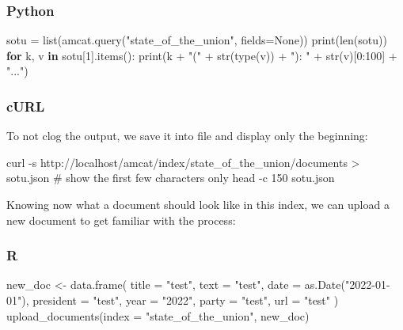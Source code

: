 \documentclass[
  letterpaper,
  DIV=11,
  numbers=noendperiod]{scrreprt}
\newenvironment{Shaded}{\begin{snugshade}}{\end{snugshade}}
\newcommand{\AttributeTok}[1]{\textcolor[rgb]{0.40,0.45,0.13}{#1}}
\newcommand{\BuiltInTok}[1]{\textcolor[rgb]{0.00,0.23,0.31}{#1}}
\newcommand{\CommentTok}[1]{\textcolor[rgb]{0.37,0.37,0.37}{#1}}
\newcommand{\ControlFlowTok}[1]{\textcolor[rgb]{0.00,0.23,0.31}{\textbf{#1}}}
\newcommand{\DecValTok}[1]{\textcolor[rgb]{0.68,0.00,0.00}{#1}}
\newcommand{\ExtensionTok}[1]{\textcolor[rgb]{0.00,0.23,0.31}{#1}}
\newcommand{\FunctionTok}[1]{\textcolor[rgb]{0.28,0.35,0.67}{#1}}
\newcommand{\KeywordTok}[1]{\textcolor[rgb]{0.00,0.23,0.31}{\textbf{#1}}}
\newcommand{\NormalTok}[1]{\textcolor[rgb]{0.00,0.23,0.31}{#1}}
\newcommand{\OperatorTok}[1]{\textcolor[rgb]{0.37,0.37,0.37}{#1}}
\newcommand{\OtherTok}[1]{\textcolor[rgb]{0.00,0.23,0.31}{#1}}
\newcommand{\StringTok}[1]{\textcolor[rgb]{0.13,0.47,0.30}{#1}}
\newcommand{\VariableTok}[1]{\textcolor[rgb]{0.07,0.07,0.07}{#1}}
\begin{document}
\subsubsection{Python}

\begin{Shaded}
\begin{Highlighting}[]
\NormalTok{sotu }\OperatorTok{=} \BuiltInTok{list}\NormalTok{(amcat.query(}\StringTok{"state\_of\_the\_union"}\NormalTok{, fields}\OperatorTok{=}\VariableTok{None}\NormalTok{))}
\BuiltInTok{print}\NormalTok{(}\BuiltInTok{len}\NormalTok{(sotu))}
\ControlFlowTok{for}\NormalTok{ k, v }\KeywordTok{in}\NormalTok{ sotu[}\DecValTok{1}\NormalTok{].items():}
  \BuiltInTok{print}\NormalTok{(k }\OperatorTok{+} \StringTok{"("} \OperatorTok{+} \BuiltInTok{str}\NormalTok{(}\BuiltInTok{type}\NormalTok{(v)) }\OperatorTok{+} \StringTok{"): "} \OperatorTok{+} \BuiltInTok{str}\NormalTok{(v)[}\DecValTok{0}\NormalTok{:}\DecValTok{100}\NormalTok{] }\OperatorTok{+} \StringTok{"..."}\NormalTok{)}
\end{Highlighting}
\end{Shaded}

\subsubsection{cURL}

To not clog the output, we save it into file and display only the
beginning:

\begin{Shaded}
\begin{Highlighting}[]
\ExtensionTok{curl} \AttributeTok{{-}s}\NormalTok{ http://localhost/amcat/index/state\_of\_the\_union/documents }\OperatorTok{\textgreater{}}\NormalTok{ sotu.json}
\CommentTok{\# show the first few characters only}
\FunctionTok{head} \AttributeTok{{-}c}\NormalTok{ 150 sotu.json}
\end{Highlighting}
\end{Shaded}

Knowing now what a document should look like in this index, we can
upload a new document to get familiar with the process:

\subsubsection{R}

\begin{Shaded}
\begin{Highlighting}[]
\NormalTok{new\_doc }\OtherTok{\textless{}{-}} \FunctionTok{data.frame}\NormalTok{(}
  \AttributeTok{title =} \StringTok{"test"}\NormalTok{,}
  \AttributeTok{text =} \StringTok{"test"}\NormalTok{,}
  \AttributeTok{date =} \FunctionTok{as.Date}\NormalTok{(}\StringTok{"2022{-}01{-}01"}\NormalTok{),}
  \AttributeTok{president =} \StringTok{"test"}\NormalTok{,}
  \AttributeTok{year =} \StringTok{"2022"}\NormalTok{,}
  \AttributeTok{party =} \StringTok{"test"}\NormalTok{,}
  \AttributeTok{url =} \StringTok{"test"}
\NormalTok{)}
\FunctionTok{upload\_documents}\NormalTok{(}\AttributeTok{index =} \StringTok{"state\_of\_the\_union"}\NormalTok{, new\_doc)}
\end{Highlighting}
\end{Shaded}
\end{document}
